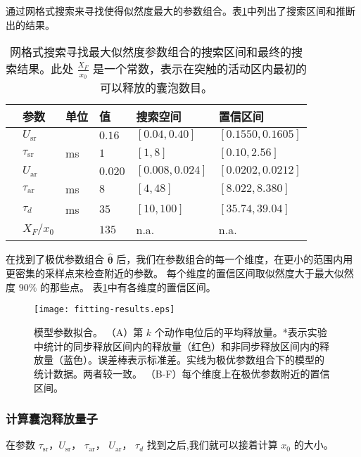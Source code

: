 通过网格式搜索来寻找使得似然度最大的参数组合。表\ref{table:parameters}中列出了搜索区间和推断出的结果。
\begin{table}
  \centering
  \begin{tabular}{llllll}
    \hline\hline
    & 参数 & 单位 & 值 & 搜索空间 & 置信区间 \\
    \hline
    & $U_\text{sr}$ & & $0.16$ & $[0.04, 0.40]$ & $[0.1550, 0.1605]$ \\
    & $\tau_\text{sr}$& ms & $1$ & $[1, 8]$ & $[0.10, 2.56]$ \\
    & $U_\text{ar}$ & & $0.020$ & $[0.008, 0.024]$ & $[0.0202, 0.0212]$ \\
    & $\tau_\text{ar}$ &ms & $8$ & $[4, 48]$ & $[8.022, 8.380]$ \\
    & $\tau_d$ &ms & $35$ & $[10, 100]$ & $[35.74, 39.04]$ \\
    & $X_F / x_0$& & $135$ & n.a. & n.a. \\
    \hline
\end{tabular}
\caption{网格式搜索寻找最大似然度参数组合的搜索区间和最终的搜索结果。此处 $\frac{X_F}{x_0}$ 是一个常数，表示在突触的活动区内最初的可以释放的囊泡数目。}
\label{table:parameters}
\end{table}

在找到了极优参数组合 $\bm{\hat{\theta}}$ 后，我们在参数组合的每一个维度，在更小的范围内用更密集的采样点来检查附近的参数。
每个维度的置信区间取似然度大于最大似然度 $90\%$ 的那些点。
表\ref{table:parameters}中有各维度的置信区间。

\begin{figure}
\centering
\texttt{[image: fitting-results.eps]}
\caption{模型参数拟合。
（A）第 $k$ 个动作电位后的平均释放量。*表示实验中统计的同步释放区间内的释放量（红色）和非同步释放区间内的释放量（蓝色）。误差棒表示标准差。实线为极优参数组合下的模型的统计数据。两者较一致。
（B-F）每个维度上在极优参数附近的置信区间。}
\label{figure:fs-pc-fitting}
\end{figure}

\subsubsection{计算囊泡释放量子}
在参数 $\tau_\text{sr}$，$U_\text{sr}$， $\tau_\text{ar}$， $U_\text{ar}$， $\tau_d$ 找到之后,我们就可以接着计算 $x_0$ 的大小。
